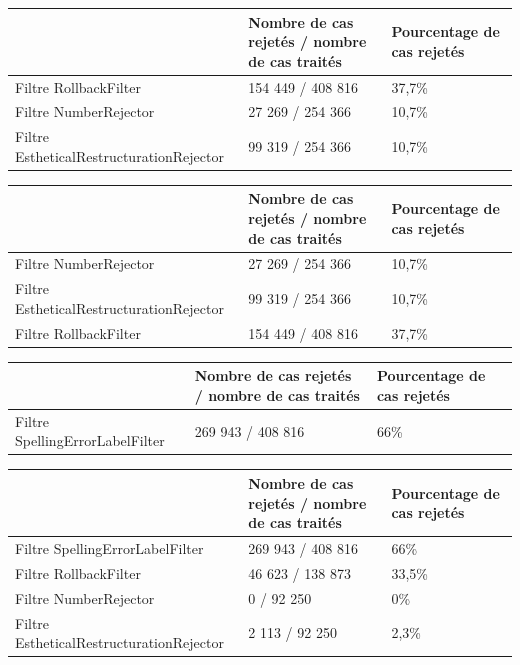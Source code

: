 \documentclass[11pt]{article}
\begin{document}
\begin{center}
\begin{tabular}{|M{6cm}|M{5cm}|M{6cm}|}
   \hline
    \, &Nombre de cas rejet\'{e}s / nombre de cas trait\'{e}s & Pourcentage de cas rejet\'{e}s \tabularnewline
   \hline
    Filtre RollbackFilter & 154 449 / 408 816 & 37,7\% \tabularnewline
   \hline
    Filtre NumberRejector & 27 269 / 254 366 & 10,7\% \tabularnewline
\hline
Filtre EstheticalRestructurationRejector & 99 319 / 254 366 & 10,7\% \tabularnewline
\hline
\end{tabular}
\end{center}





\begin{center}
\begin{tabular}{|M{6cm}|M{5cm}|M{6cm}|}
   \hline
    \, &Nombre de cas rejet\'{e}s / nombre de cas trait\'{e}s & Pourcentage de cas rejet\'{e}s \tabularnewline
   \hline
    Filtre NumberRejector & 27 269 / 254 366 & 10,7\% \tabularnewline
\hline
Filtre EstheticalRestructurationRejector & 99 319 / 254 366 & 10,7\% \tabularnewline
 \hline
    Filtre RollbackFilter & 154 449 / 408 816 & 37,7\% \tabularnewline
\hline

\end{tabular}
\end{center}





\begin{center}
\begin{tabular}{|M{4cm}|M{5cm}|M{6cm}|}
   \hline
    \, &Nombre de cas rejet\'{e}s / nombre de cas trait\'{e}s & Pourcentage de cas rejet\'{e}s \tabularnewline
   \hline
    Filtre SpellingErrorLabelFilter & 269 943 / 408 816 & 66\% \tabularnewline
   \hline
\end{tabular}
\end{center}




\begin{center}
\begin{tabular}{|M{6cm}|M{5cm}|M{6cm}|}
   \hline
    \, &Nombre de cas rejet\'{e}s / nombre de cas trait\'{e}s & Pourcentage de cas rejet\'{e}s \tabularnewline
    \hline
    Filtre SpellingErrorLabelFilter & 269 943 / 408 816 & 66\% \tabularnewline
   \hline
       Filtre RollbackFilter & 46 623 / 138 873 & 33,5\% \tabularnewline
 \hline
    Filtre NumberRejector & 0 / 92 250 & 0\% \tabularnewline
\hline
Filtre EstheticalRestructurationRejector & 2 113 / 92 250 & 2,3\% \tabularnewline
\hline
\end{tabular}
\end{center}
\end{document}
